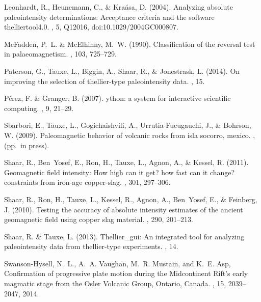 \documentclass[11pt]{book}
\begin{document}
{{\begin{thebibliography}{}
Leonhardt, R., Heunemann, C., \& Kra\'asa, D. (2004).
\newblock Analyzing absolute paleointensity determinations: Acceptance criteria
  and the software thelliertool4.0.
, 5, Q12016, doi:10.1029/2004GC000807.

McFadden, P.~L. \& McElhinny, M.~W. (1990).
\newblock Classification of the reversal test in palaeomagnetism.
, 103, 725--729.

Paterson, G., Tauxe, L., Biggin, A., Shaar, R., \& Jonestrask, L. (2014).
\newblock On improving the selection of thellier-type paleointensity data.
, 15.

P\'{e}rez, F. \& Granger, B. (2007).
ython: a system for interactive scientific computing.
, 9, 21--29.

Sbarbori, E., Tauxe, L., Gogichaishvili, A., Urrutia-Fucugauchi, J., \&
  Bohrson, W. (2009).
\newblock Paleomagnetic behavior of volcanic rocks from isla socorro, mexico.
, (pp.\ in press).

Shaar, R., Ben~Yosef, E., Ron, H., Tauxe, L., Agnon, A., \& Kessel, R. (2011).
\newblock Geomagnetic field intensity: How high can it get? how fast can it
  change? constraints from iron-age copper-slag.
, 301, 297--306.

Shaar, R., Ron, H., Tauxe, L., Kessel, R., Agnon, A., Ben~Yosef, E., \&
  Feinberg, J. (2010).
\newblock Testing the accuracy of absolute intensity estimates of the ancient
  geomagnetic field using copper slag material.
, 290, 201--213.

Shaar, R. \& Tauxe, L. (2013).
\newblock Thellier\_gui: An integrated tool for analyzing paleointensity data
  from thellier-type experiments.
, 14.

Swanson-Hysell, N.~L., A.~A. Vaughan, M.~R. Mustain, and K.~E. Asp,
\newblock Confirmation of progressive plate motion during the Midcontinent Rift's early
  magmatic stage from the Osler Volcanic Group, Ontario, Canada.
  , 15, 2039--2047, 2014.


\end{thebibliography}}}
\end{document}

